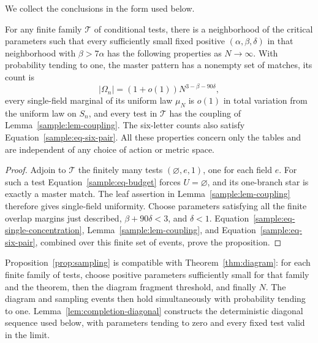 We collect the conclusions in the form used below.
\begin{proposition}\label{prop:sampling}
For any finite family $\mathcal T$ of conditional tests, there is a
neighborhood of the critical parameters such that every sufficiently
small fixed positive $(\alpha,\beta,\delta)$ in that neighborhood
with $\beta>7\alpha$ has the following properties as $N\to\infty$.
With probability tending to one, the master pattern has a nonempty
set of matches, its count is
\[
|\Omega_n|=(1+o(1))N^{3-\beta-90\delta},
\]
every single-field marginal of its uniform law $\mu_N$ is $o(1)$
in total variation from the uniform law on $S_n$, and every test in
$\mathcal T$ has the coupling of Lemma~\ref{sample:lem-coupling}.
The six-letter counts also satisfy Equation~\eqref{sample:eq-six-pair}.
All these properties concern only the tables and are independent of
any choice of action or metric space.
\end{proposition}
\begin{proof}
Adjoin to $\mathcal T$ the finitely many tests
$(\varnothing,e,1)$, one for each field $e$.  For such a test
Equation~\eqref{sample:eq-budget} forces $U=\varnothing$, and its
one-branch star is exactly a master match.  The leaf assertion in
Lemma~\ref{sample:lem-coupling} therefore gives single-field
uniformity.  Choose parameters satisfying all the finite overlap
margins just described, $\beta+90\delta<3$, and $\delta<1$.
Equation~\eqref{sample:eq-single-concentration},
Lemma~\ref{sample:lem-coupling}, and
Equation~\eqref{sample:eq-six-pair}, combined over this finite set of
events, prove the proposition.
\end{proof}

\begin{remark}\label{sample:rem-diagonal}
Proposition~\ref{prop:sampling} is compatible with
Theorem~\ref{thm:diagram}: for each finite family of tests, choose
positive parameters sufficiently small for that family and the theorem,
then the diagram fragment threshold, and finally $N$.
The diagram and sampling events then hold simultaneously with probability
tending to one.  Lemma~\ref{lem:completion-diagonal} constructs the
deterministic diagonal sequence used below, with parameters tending to
zero and every fixed test valid in the limit.
\end{remark}

